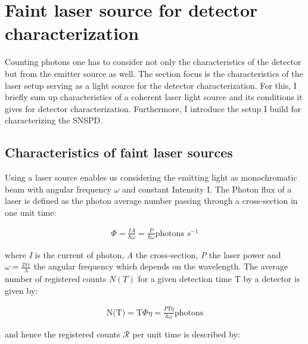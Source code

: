 
\chapter{Faint laser source for detector characterization}
\label{sec:SNSPD_setup}

Counting photons one has to consider not only the characteristics of the detector but from the emitter source as well.
The section focus is the characteristics of the laser setup serving as a light source for the detector characterization.
For this, I briefly sum up characteristics of a coherent laser light source and its conditions it gives for detector
characterization.
Furthermore, I introduce the setup I build for characterizing the SNSPD.

\section{Characteristics of faint laser sources}\label{sec:characteristics_faint laser sources}


Using a laser source enables us considering the emitting light as monochromatic beam with angular frequency $\omega$
and constant Intensity I. The Photon flux of a laser is defined as the photon average number passing through
a cross-section in one unit time:

\begin{align}
    \Phi = \frac{I A}{\hbar \omega} = \frac{P}{\hbar \omega} \text{photons $s^{-1}$}
\end{align}

where \textit{I} is the current of photon, \textit{A} the cross-section, \textit{P} the laser power and $\omega = \frac{2 \pi c}{\lambda}$ the angular frequency which
depends on the wavelength.
The average number of registered counts $N(T)$ for a given detection time T by a detector is given by:

\begin{align}
    \text{N(T)} = \text{T} \Phi \eta= \frac{P T \eta}{\hbar \omega} \text{photons}
\end{align}

and hence the registered counts $\mathcal{R}$ per unit time is described by:

